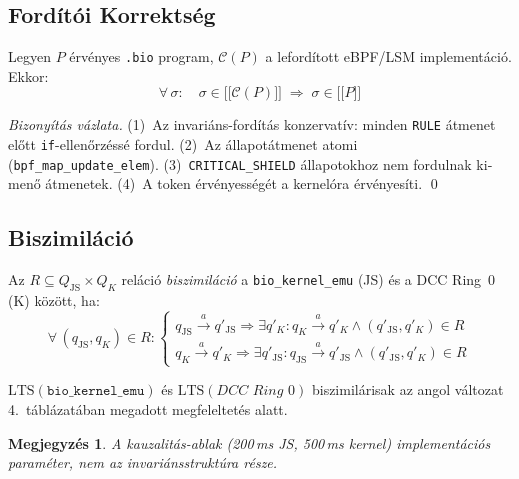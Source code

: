 \documentclass[11pt,a4paper,twoside]{article}
\newcommand{\sem}[1]{\mathopen{[\![}#1\mathclose{]\!]}}
\newcommand{\tm}[1]{\texttt{#1}}
\newtheorem*{megjegyzes}{Megjegyzés}
\begin{document}
\begin{magyar}
\subsection{Fordítói Korrektség}

\begin{tetel}\label{thm:korrektség}
Legyen $P$ érvényes \texttt{.bio} program, $\mathcal{C}(P)$ a lefordított
eBPF/LSM implementáció. Ekkor:
\[
  \forall\,\sigma:\quad \sigma \in \sem{\mathcal{C}(P)} \;\Longrightarrow\; \sigma \in \sem{P}
\]
\end{tetel}
\begin{proof}[Bizonyítás vázlata]
(1)~Az invariáns-fordítás konzervatív: minden \texttt{RULE} átmenet előtt
\texttt{if}-ellenőrzéssé fordul.
(2)~Az állapotátmenet atomi (\texttt{bpf\_map\_update\_elem}).
(3)~\tm{CRITICAL\_SHIELD} állapotokhoz nem fordulnak kimenő átmenetek.
(4)~A token érvényességét a kernelóra érvényesíti. \qed
\end{proof}

\subsection{Biszimiláció}

\begin{definicio}[Biszimiláció]\label{def:biszim_hu}
Az $R \subseteq Q_\mathrm{JS} \times Q_K$ reláció \emph{biszimiláció} a
\texttt{bio\_kernel\_emu} (JS) és a DCC Ring~0 (K) között, ha:
\[
\forall\,(q_\mathrm{JS},q_K)\in R:\begin{cases}
  q_\mathrm{JS}\xrightarrow{a}q'_\mathrm{JS} \Rightarrow \exists q'_K: q_K\xrightarrow{a}q'_K \wedge (q'_\mathrm{JS},q'_K)\in R \\
  q_K\xrightarrow{a}q'_K \Rightarrow \exists q'_\mathrm{JS}: q_\mathrm{JS}\xrightarrow{a}q'_\mathrm{JS} \wedge (q'_\mathrm{JS},q'_K)\in R
\end{cases}
\]
\end{definicio}

\begin{tetel}[Biszimiláció]\label{thm:biszim_hu}
$\mathrm{LTS}(\texttt{bio\_kernel\_emu})$ és $\mathrm{LTS}(\textit{DCC Ring~0})$
biszimilárisak az angol változat 4.~táblázatában megadott megfeleltetés alatt.
\end{tetel}

\begin{megjegyzes}
A kauzalitás-ablak (200\,ms JS, 500\,ms kernel) implementációs paraméter,
nem az invariánsstruktúra része.
\end{megjegyzes}


\end{magyar}
\end{document}
